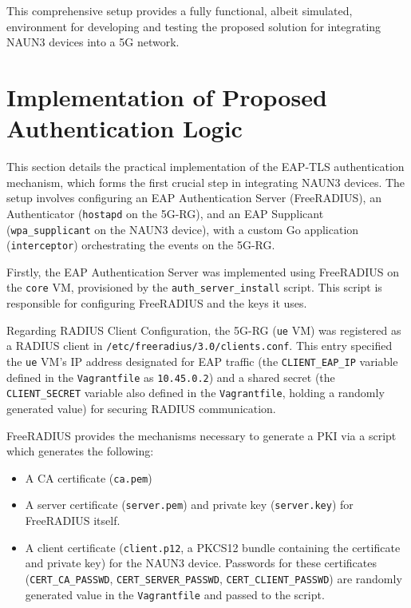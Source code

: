 This comprehensive setup provides a fully functional, albeit simulated, environment for developing and testing the proposed solution for integrating \ac{NAUN3} devices into a \ac{5G} network.

\section{Implementation of Proposed Authentication Logic}

This section details the practical implementation of the \ac{EAP-TLS} authentication mechanism, which forms the first crucial step in integrating \ac{NAUN3} devices. The setup involves configuring an \ac{EAP} Authentication Server (FreeRADIUS), an Authenticator (\texttt{hostapd} on the \ac{5G-RG}), and an \ac{EAP} Supplicant (\texttt{wpa\_supplicant} on the \ac{NAUN3} device), with a custom Go application (\texttt{interceptor}) orchestrating the events on the \ac{5G-RG}.

Firstly, the \ac{EAP} Authentication Server was implemented using FreeRADIUS on the \texttt{core} \ac{VM}, provisioned by the \texttt{auth\_server\_install} script. This script is responsible for configuring FreeRADIUS and the keys it uses.

Regarding \ac{RADIUS} Client Configuration, the \ac{5G-RG} (\texttt{ue} \ac{VM}) was registered as a \ac{RADIUS} client in \texttt{/etc/freeradius/3.0/clients.conf}. This entry specified the \texttt{ue} \ac{VM}'s \ac{IP} address designated for \ac{EAP} traffic (the \texttt{CLIENT\_EAP\_IP} variable defined in the \texttt{Vagrantfile} as \texttt{10.45.0.2}) and a shared secret (the \texttt{CLIENT\_SECRET} variable also defined in the \texttt{Vagrantfile}, holding a randomly generated value) for securing \ac{RADIUS} communication.

FreeRADIUS provides the mechanisms necessary to generate a \ac{PKI} via a script which generates the following:

\begin{itemize}
    \item A \ac{CA} certificate (\texttt{ca.pem})
    \item A server certificate (\texttt{server.pem}) and private key (\texttt{server.key}) for FreeRADIUS itself.
    \item A client certificate (\texttt{client.p12}, a \ac{PKCS12} bundle containing the certificate and private key) for the \ac{NAUN3} device. Passwords for these certificates (\texttt{CERT\_CA\_PASSWD}, \texttt{CERT\_SERVER\_PASSWD}, \texttt{CERT\_CLIENT\_PASSWD}) are randomly generated value in the \texttt{Vagrantfile} and passed to the script.
\end{itemize}

